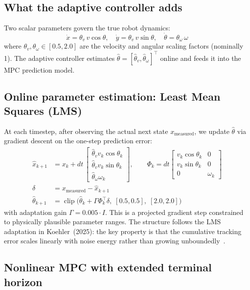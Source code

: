 \documentclass[12pt,a4paper]{article}
\begin{document}
\subsection{What the adaptive controller adds}

Two scalar parameters govern the true robot dynamics:
\[
  \dot{x} = \theta_v \, v \cos\theta, \quad
  \dot{y} = \theta_v \, v \sin\theta, \quad
  \dot{\theta} = \theta_\omega \, \omega
\]
where $\theta_v, \theta_\omega \in [0.5, 2.0]$ are the velocity and angular scaling factors (nominally 1). The adaptive controller estimates $\hat{\theta} = [\hat{\theta}_v, \hat{\theta}_\omega]^\top$ online and feeds it into the MPC prediction model.

\subsection{Online parameter estimation: Least Mean Squares (LMS)}

At each timestep, after observing the actual next state $x_{\text{measured}}$, we update $\hat{\theta}$ via gradient descent on the one-step prediction error:
\begin{align}
  \hat{x}_{k+1} &= x_k + dt\,\begin{bmatrix}
    \hat{\theta}_v v_k \cos\theta_k\\
    \hat{\theta}_v v_k \sin\theta_k\\
    \hat{\theta}_\omega \omega_k
  \end{bmatrix}, \qquad
  \Phi_k = dt\begin{bmatrix}
    v_k\cos\theta_k & 0\\
    v_k\sin\theta_k & 0\\
    0 & \omega_k
  \end{bmatrix}\\
  \delta &= x_{\text{measured}} - \hat{x}_{k+1}\\
  \hat{\theta}_{k+1} &= \operatorname{clip}\!\bigl(\hat{\theta}_k + \Gamma \Phi_k^\top \delta,\;
    [0.5,0.5],\; [2.0,2.0]\bigr)
\end{align}
with adaptation gain $\Gamma = 0.005 \cdot I$. This is a projected gradient step constrained to physically plausible parameter ranges. The structure follows the LMS adaptation in Koehler~(2025): the key property is that the cumulative tracking error scales linearly with noise energy rather than growing unboundedly~\cite{koehler2025}.

\subsection{Nonlinear MPC with extended terminal horizon}
\end{document}
